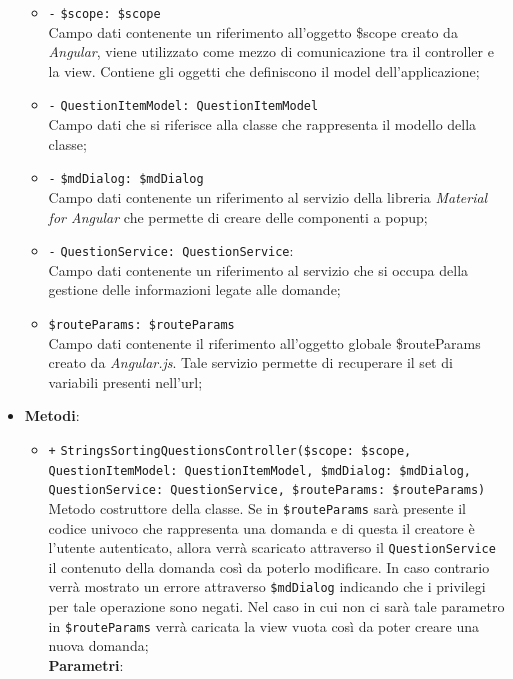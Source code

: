 \begin{itemize}
\begin{itemize}
		\item \texttt{-} \texttt{\$scope: \$scope} \\
		Campo dati contenente un riferimento all’oggetto \$scope creato da \textit{Angular}, viene utilizzato come mezzo di comunicazione tra il controller e la view. Contiene gli oggetti che definiscono il model dell’applicazione;
		\item \texttt{-} \texttt{QuestionItemModel: QuestionItemModel} \\
		Campo dati che si riferisce alla classe che rappresenta il modello della classe;
		\item \texttt{-} \texttt{\$mdDialog: \$mdDialog} \\
		Campo dati contenente un riferimento al servizio della libreria \textit{Material for Angular} che permette di creare delle componenti a popup;
		\item \texttt{-} \texttt{QuestionService: QuestionService}: \\
		Campo dati contenente un riferimento al servizio che si occupa della gestione delle informazioni legate alle domande;
		\item \texttt{\$routeParams: \$routeParams} \\
		Campo dati contenente il riferimento all'oggetto globale \$routeParams creato da \textit{Angular.js}. Tale servizio permette di recuperare il set di variabili presenti nell'url; 
	\end{itemize}
	\item \textbf{Metodi}:
	\begin{itemize}
		\item \texttt{+} \texttt{StringsSortingQuestionsController(\$scope: \$scope, QuestionItemModel: QuestionItemModel, \$mdDialog: \$mdDialog, QuestionService: QuestionService, \$routeParams: \$routeParams)} \\ 
		Metodo costruttore della classe. Se in \texttt{\$routeParams} sarà presente il codice univoco che rappresenta una domanda e di questa il creatore è l'utente autenticato, allora verrà scaricato attraverso il \texttt{QuestionService} il contenuto della domanda così da poterlo modificare. In caso contrario verrà mostrato un errore attraverso \texttt{\$mdDialog} indicando che i privilegi per tale operazione sono negati. Nel caso in cui non ci sarà tale parametro in \texttt{\$routeParams} verrà caricata la view vuota così da poter creare una nuova domanda; \\
		\textbf{Parametri}:
		\begin{itemize}

\end{itemize}
\end{itemize}
\end{itemize}
